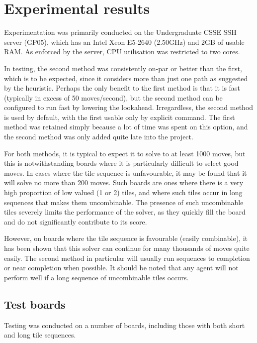 \documentclass[a4paper, 11pt, titlepage]{report}
\begin{document}
\section{Experimental results}
Experimentation was primarily conducted on the Undergraduate CSSE SSH server (GP05), which has an Intel Xeon E5-2640 (2.50GHz) and 2GB of usable RAM. As enforced by the server, CPU utilisation was restricted to two cores.

In testing, the second method was consistently on-par or better than the first, which is to be expected, since it considers more than just one path as suggested by the heuristic. Perhaps the only benefit to the first method is that it is fast (typically in excess of 50 moves/second), but the second method can be configured to run fast by lowering the lookahead. Irregardless, the second method is used by default, with the first usable only by explicit command. The first method was retained simply because a lot of time was spent on this option, and the second method was only added quite late into the project.

For both methods, it is typical to expect it to solve to at least 1000 moves, but this is notwithstanding boards where it is particularly difficult to select good moves. In cases where the tile sequence is unfavourable, it may be found that it will solve no more than 200 moves. Such boards are ones where there is a very high proportion of low valued (1 or 2) tiles, and where such tiles occur in long sequences that makes them uncombinable. The presence of such uncombinable tiles severely limits the performance of the solver, as they quickly fill the board and do not significantly contribute to its score.

However, on boards where the tile sequence is favourable (easily combinable), it has been shown that this solver can continue for many thousands of moves quite easily. The second method in particular will usually run sequences to completion or near completion when possible. It should be noted that any agent will not perform well if a long sequence of uncombinable tiles occurs. 

\subsection{Test boards}
Testing was conducted on a number of boards, including those with both short and long tile sequences.
\end{document}
